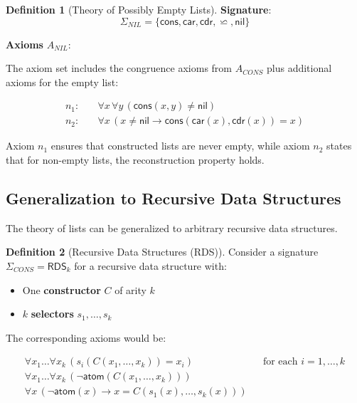 \documentclass[11pt,a4paper]{article}
\theoremstyle{definition}
\newtheorem{definition}{Definition}[section]
\theoremstyle{plain}
\theoremstyle{remark}
\begin{document}
\begin{definition}[Theory of Possibly Empty Lists]
\textbf{Signature}:
\[
\Sigma_{NIL} = \{\textsf{cons}, \textsf{car}, \textsf{cdr}, \backsimeq, \textsf{nil}\}
\]

\textbf{Axioms} $A_{NIL}$:

The axiom set includes the congruence axioms from $A_{CONS}$ plus additional axioms for the empty list:

\begin{align*}
n_1: & \quad \forall x \, \forall y \, (\textsf{cons}(x, y) \neq \textsf{nil}) \\
n_2: & \quad \forall x \, (x \neq \textsf{nil} \rightarrow \textsf{cons}(\textsf{car}(x), \textsf{cdr}(x)) = x)
\end{align*}
\end{definition}

Axiom $n_1$ ensures that constructed lists are never empty, while axiom $n_2$ states that for non-empty lists, the reconstruction property holds.

\subsection{Generalization to Recursive Data Structures}

The theory of lists can be generalized to arbitrary recursive data structures.

\begin{definition}[Recursive Data Structures (RDS)]
Consider a signature $\Sigma_{CONS} = \textsf{RDS}_k$ for a recursive data structure with:

\begin{itemize}
    \item One \textbf{constructor} $C$ of arity $k$
    \item $k$ \textbf{selectors} $s_1, \dots, s_k$
\end{itemize}

The corresponding axioms would be:

\begin{align*}
\forall x_1 \dots \forall x_k \, (s_i(C(x_1, \dots, x_k)) = x_i) && \text{for each } i = 1, \dots, k \\
\forall x_1 \dots \forall x_k \, (\neg \textsf{atom}(C(x_1, \dots, x_k))) \\
\forall x \, (\neg \textsf{atom}(x) \rightarrow x = C(s_1(x), \dots, s_k(x)))
\end{align*}
\end{definition}
\end{document}
